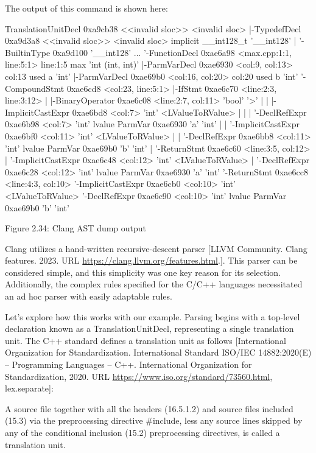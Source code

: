 The output of this command is shown here:

\begin{shell}
TranslationUnitDecl 0xa9cb38 <<invalid sloc>> <invalid sloc>
|-TypedefDecl 0xa9d3a8 <<invalid sloc>> <invalid sloc>
implicit __int128_t '__int128'
| '-BuiltinType 0xa9d100 '__int128'
...
'-FunctionDecl 0xae6a98 <max.cpp:1:1, line:5:1> line:1:5 max
'int (int, int)'
  |-ParmVarDecl 0xae6930 <col:9, col:13> col:13 used a 'int'
  |-ParmVarDecl 0xae69b0 <col:16, col:20> col:20 used b 'int'
  '-CompoundStmt 0xae6cd8 <col:23, line:5:1>
    |-IfStmt 0xae6c70 <line:2:3, line:3:12>
    | |-BinaryOperator 0xae6c08 <line:2:7, col:11> 'bool' '>'
    | | |-ImplicitCastExpr 0xae6bd8 <col:7> 'int' <LValueToRValue>
    | | | '-DeclRefExpr 0xae6b98 <col:7> 'int' lvalue ParmVar 0xae6930
            'a' 'int'
    | | '-ImplicitCastExpr 0xae6bf0 <col:11> 'int' <LValueToRValue>
    | |   '-DeclRefExpr 0xae6bb8 <col:11> 'int' lvalue ParmVar 0xae69b0
            'b' 'int'
    | '-ReturnStmt 0xae6c60 <line:3:5, col:12>
    |   '-ImplicitCastExpr 0xae6c48 <col:12> 'int' <LValueToRValue>
    |     '-DeclRefExpr 0xae6c28 <col:12> 'int' lvalue ParmVar 0xae6930
            'a' 'int'
    '-ReturnStmt 0xae6cc8 <line:4:3, col:10>
      '-ImplicitCastExpr 0xae6cb0 <col:10> 'int' <LValueToRValue>
        '-DeclRefExpr 0xae6c90 <col:10> 'int' lvalue ParmVar 0xae69b0
            'b' 'int'
\end{shell}

\begin{center}
Figure 2.34: Clang AST dump output
\end{center}

Clang utilizes a hand-written recursive-descent parser [LLVM Community. Clang features. 2023. URL \url{https://clang.llvm.org/features.html}.]. This parser can be considered simple, and this simplicity was one key reason for its selection. Additionally, the complex rules specified for the C/C++ languages necessitated an ad hoc parser with easily adaptable rules.

Let's explore how this works with our example. Parsing begins with a top-level declaration known as a TranslationUnitDecl, representing a single translation unit. The C++ standard defines a translation unit as follows [International Organization for Standardization. International Standard ISO/IEC 14882:2020(E) – Programming Languages – C++. International Organization for Standardization, 2020. URL \url{https://www.iso.org/standard/73560.html}, lex.separate]:

A source file together with all the headers (16.5.1.2) and source files included (15.3) via the preprocessing directive \#include, less any source lines skipped by any of the conditional inclusion (15.2) preprocessing directives, is called a translation unit.

